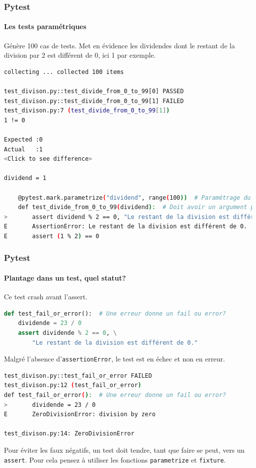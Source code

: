 \documentclass{beamer}
\begin{document}
    \begin{frame}[fragile]
        \frametitle{Pytest}
        \framesubtitle{Les tests paramétriques}
        \transdissolve
        Génère 100 cas de tests. Met en évidence les dividendes dont le restant de la division par 2 est différent de 0, ici 1 par exemple.
        \begin{lstlisting}[language=sh]
collecting ... collected 100 items

test_divison.py::test_divide_from_0_to_99[0] PASSED                      [  1%]
test_divison.py::test_divide_from_0_to_99[1] FAILED                      [  2%]
test_divison.py:7 (test_divide_from_0_to_99[1])
1 != 0

Expected :0
Actual   :1
<Click to see difference>

dividend = 1

    @pytest.mark.parametrize("dividend", range(100))  # Paramétrage du test
    def test_divide_from_0_to_99(dividend):  # Doit avoir un argument présent dans le paramétrage
>       assert dividend % 2 == 0, "Le restant de la division est différent de 0."
E       AssertionError: Le restant de la division est différent de 0.
E       assert (1 % 2) == 0
        \end{lstlisting}
    \end{frame}

    \begin{frame}[fragile]
        \frametitle{Pytest}
        \framesubtitle{Plantage dans un test, quel statut?}
        \transdissolve
        Ce test crash avant l'assert.
        \begin{lstlisting}[language=Python]
def test_fail_or_error():  # Une erreur donne un fail ou error?
    dividende = 23 / 0
    assert dividende % 2 == 0, \
        "Le restant de la division est différent de 0."
        \end{lstlisting}
        Malgré l'absence d'\lstinline{assertionError}, le test est en échec et non en erreur.
        \begin{lstlisting}[language=sh]
test_divison.py::test_fail_or_error FAILED                               [100%]
test_divison.py:12 (test_fail_or_error)
def test_fail_or_error():  # Une erreur donne un fail ou error?
>       dividende = 23 / 0
E       ZeroDivisionError: division by zero

test_divison.py:14: ZeroDivisionError
        \end{lstlisting}

        \begin{dangercolorbox}
            Pour éviter les faux négatifs, un test doit tendre, tant que faire se peut, vers un \lstinline{assert}. Pour cela pensez à utiliser les fonctions \lstinline{parametrize} et \lstinline{fixture}.
        \end{dangercolorbox}
    \end{frame}
\end{document}
